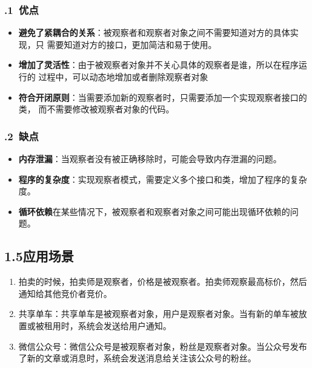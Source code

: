 \documentclass[24pt,a4paper]{article}%
\begin{document}
\subsubsection*{.1\ 优点}
\begin{itemize}
    \item \textbf{避免了紧耦合的关系}：被观察者和观察者对象之间不需要知道对方的具体实现，只
    需要知道对方的接口，更加简洁和易于使用。
    \item \textbf{增加了灵活性}：由于被观察者对象并不关心具体的观察者是谁，所以在程序运行的
    过程中，可以动态地增加或者删除观察者对象
    \item \textbf{符合开闭原则}：当需要添加新的观察者时，只需要添加一个实现观察者接口的类，
    而不需要修改被观察者对象的代码。
\end{itemize}

\subsubsection*{.2\ 缺点}
\begin{itemize}
    \item \textbf{内存泄漏}：当观察者没有被正确移除时，可能会导致内存泄漏的问题。
    \item \textbf{程序的复杂度}：实现观察者模式，需要定义多个接口和类，增加了程序的复杂度。
    \item \textbf{循环依赖}在某些情况下，被观察者和观察者对象之间可能出现循环依赖的问题。
\end{itemize}

\subsection*{\songti 1.5应用场景}
\begin{enumerate}
    \item 拍卖的时候，拍卖师是观察者，价格是被观察者。拍卖师观察最高标价，然后通知给其他竞价者竞价。
    \item 共享单车：共享单车是被观察者对象，用户是观察者对象。当有新的单车被放置或被租用时，系统会发送给用户通知。
    \item 微信公众号：微信公众号是被观察者对象，粉丝是观察者对象。当公众号发布了新的文章或消息时，系统会发送消息给关注该公众号的粉丝。
\end{enumerate}
\end{document}
